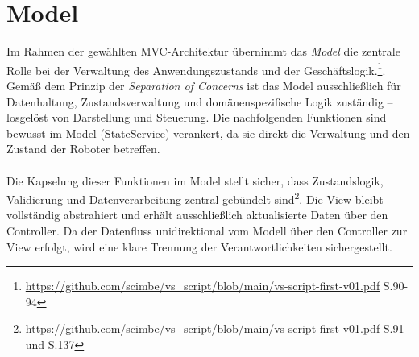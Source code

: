\clearpage

\section{Model}
Im Rahmen der gewählten MVC-Architektur übernimmt das \textit{Model} die zentrale Rolle bei der Verwaltung des Anwendungszustands und der Geschäftslogik.\footnote{\url{https://github.com/scimbe/vs_script/blob/main/vs-script-first-v01.pdf} S.90-94}. 
Gemäß dem Prinzip der \textit{Separation of Concerns} ist das Model ausschließlich für Datenhaltung, Zustandsverwaltung und domänenspezifische Logik zuständig – losgelöst von Darstellung und Steuerung. 
Die nachfolgenden Funktionen sind bewusst im Model (StateService) verankert, da sie direkt die Verwaltung und den Zustand der Roboter betreffen.
\\\\%
Die Kapselung dieser Funktionen im Model stellt sicher, dass Zustandslogik, Validierung und Datenverarbeitung zentral gebündelt sind\footnote{\url{https://github.com/scimbe/vs_script/blob/main/vs-script-first-v01.pdf} S.91 und S.137}.
Die View bleibt vollständig abstrahiert und erhält ausschließlich aktualisierte Daten über den Controller. 
Da der Datenfluss unidirektional vom Modell über den Controller zur View erfolgt, wird eine klare Trennung der Verantwortlichkeiten sichergestellt. 

